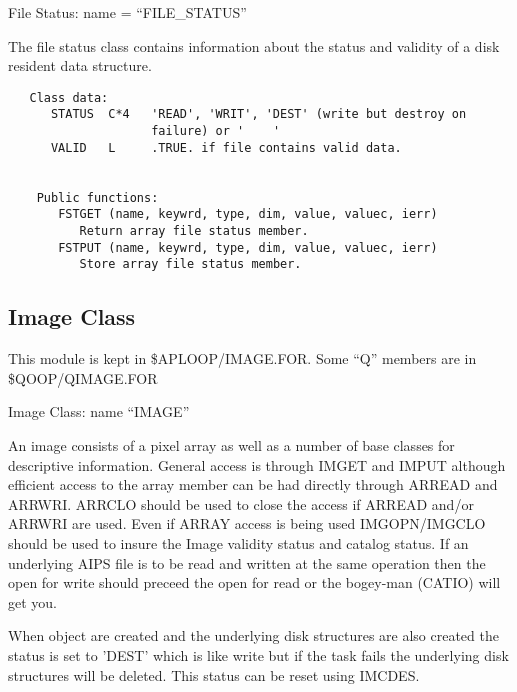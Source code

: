    File Status: name = ``FILE\_STATUS''

   The file status class contains information about the status and
validity of a disk resident data structure.
{\small\begin{verbatim}
   Class data:
      STATUS  C*4   'READ', 'WRIT', 'DEST' (write but destroy on
                    failure) or '    '
      VALID   L     .TRUE. if file contains valid data.


    Public functions:
       FSTGET (name, keywrd, type, dim, value, valuec, ierr)
          Return array file status member.
       FSTPUT (name, keywrd, type, dim, value, valuec, ierr)
          Store array file status member.
\end{verbatim}}

\subsection{Image Class}

   This module is kept in \$APLOOP/IMAGE.FOR.  Some ``Q'' members are
in \$QOOP/QIMAGE.FOR

   Image Class: name ``IMAGE''

An image consists of a pixel array as well as a number of base
classes for descriptive information.  General access is through
IMGET and IMPUT although efficient access to the array member can be
had directly through ARREAD and ARRWRI.   ARRCLO should be used to
close the access if ARREAD and/or ARRWRI are used.  Even if ARRAY
access is being used IMGOPN/IMGCLO should be used to insure the Image
validity status and catalog status.  If an underlying AIPS file is to
be read and written at the same operation then the open for write
should preceed the open for read or the bogey-man (CATIO) will get
you.

   When object are created and the underlying disk structures are also
created the status is set to 'DEST' which is like write but if the
task fails the underlying disk structures will be deleted.  This
status can be reset using IMCDES.

